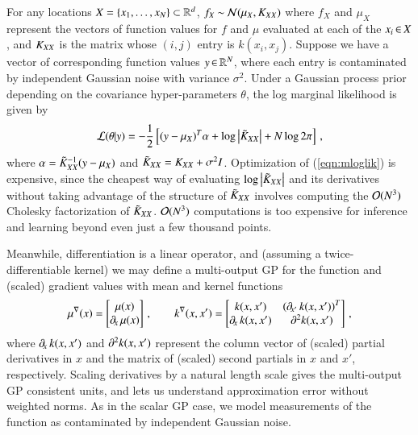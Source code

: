 For any locations $X = \{x_1,\ldots,x_N\} \subset \mathbb{R}^d$, $f_X \mathbin{\sim} \mathcal{N}
(\mu_X, K_{XX})$ where $f_X$ and $\mu_X$ represent the vectors of function
values for $f$ and $\mu$ evaluated at each of the $x_i \operatorname{\in} X$, and $K_{XX}$ is
the matrix whose $(i,j)$ entry is $k(x_i, x_j)$. Suppose we have a vector of
corresponding function values $y \operatorname{\in} \mathbb{R}^N$, where each entry is contaminated
by independent Gaussian noise with variance $\sigma^2$. Under a Gaussian process
prior depending on the covariance hyper\hyp{}parameters $\theta$, the log
marginal likelihood is given by
\begin{equation}\label{eqn:mloglik}
  \mathcal{L}(\theta|y) = -\frac{1}{2}\left[(y-\mu_X)^T\alpha + \log\left\lvert\tilde{K}_{XX}\right\rvert
  + N\log 2\pi\right]\,,
\end{equation}
where $\alpha = \tilde{K}_{XX}^{-1}(y-\mu_X)$ and $\tilde{K}_{XX} = K_{XX} +\sigma^2I$.
Optimization of (\ref{eqn:mloglik}) is expensive, since the cheapest way of
evaluating $\log\left\lvert\tilde{K}_{XX}\right\rvert$ and its derivatives without taking advantage
of the structure of $\tilde{K}_{XX}$ involves computing the $\mathcal{O}(N^3)$ Cholesky
factorization of $\tilde{K}_{XX}$. $\mathcal{O}(N^3)$ computations is too expensive for
inference and learning beyond even just a few thousand points.

Meanwhile, differentiation is a linear operator, and (assuming a 
twice\hyp{}differentiable kernel) we may define a multi\hyp{}output GP for the
function and (scaled) gradient values with mean and kernel functions
\begin{equation}\label{eqn:meankernelderiv}
  \mu^{\nabla}(x) =
  \begin{bmatrix}
    \mu(x) \\ \operatorname{\partial\!}_x \mu(x)
  \end{bmatrix}\,, \qquad
  k^{\nabla}(x,x') =
  \begin{bmatrix}
    k(x,x') & \left( \operatorname{\partial\!}_{x'} k(x,x') \right)^T \\
    \operatorname{\partial\!}_x k(x,x') & \operatorname{\partial^2\!} k(x,x')
  \end{bmatrix}\,,
\end{equation}
where $\operatorname{\partial\!}_x k(x,x')$ and $\operatorname{\partial^2\!} k(x,x')$ represent the column vector of 
(scaled) partial derivatives in $x$ and the matrix of (scaled) second partials
in $x$ and $x'$, respectively. Scaling derivatives by a natural length scale
gives the multi\hyp{}output GP consistent units, and lets us understand
approximation error without weighted norms. As in the scalar GP case, we model
measurements of the function as contaminated by independent Gaussian noise.

